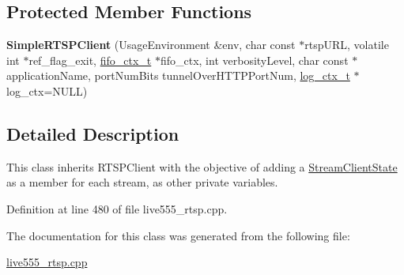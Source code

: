 \subsection*{Protected Member Functions}
\begin{DoxyCompactItemize}
\item 
{\bfseries Simple\+R\+T\+S\+P\+Client} (Usage\+Environment \&env, char const $\ast$rtsp\+U\+RL, volatile int $\ast$ref\+\_\+flag\+\_\+exit, \hyperlink{structfifo__ctx__s}{fifo\+\_\+ctx\+\_\+t} $\ast$fifo\+\_\+ctx, int verbosity\+Level, char const $\ast$application\+Name, port\+Num\+Bits tunnel\+Over\+H\+T\+T\+P\+Port\+Num, \hyperlink{structlog__ctx__s}{log\+\_\+ctx\+\_\+t} $\ast$log\+\_\+ctx=N\+U\+LL)\hypertarget{classSimpleRTSPClient_acc028f7094149456d884b347f720b663}{}\label{classSimpleRTSPClient_acc028f7094149456d884b347f720b663}

\end{DoxyCompactItemize}


\subsection{Detailed Description}
This class inherits R\+T\+S\+P\+Client with the objective of adding a \hyperlink{classStreamClientState}{Stream\+Client\+State} as a member for each stream, as other private variables. 

Definition at line 480 of file live555\+\_\+rtsp.\+cpp.



The documentation for this class was generated from the following file\+:\begin{DoxyCompactItemize}
\item 
\hyperlink{live555__rtsp_8cpp}{live555\+\_\+rtsp.\+cpp}\end{DoxyCompactItemize}
